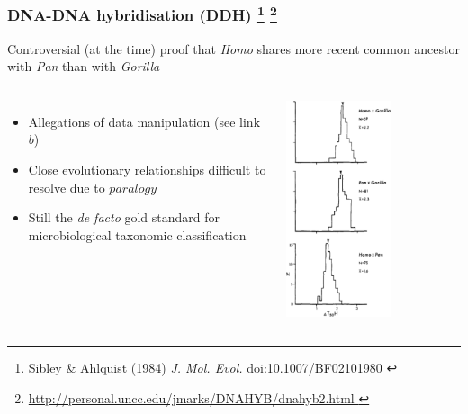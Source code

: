 %
\begin{frame}
  \frametitle{DNA-DNA hybridisation (DDH)
  \footnote{\tiny{\href{http://dx.doi.org/10.1007/BF02101980
}{Sibley \& Ahlquist (1984) \textit{J. Mol. Evol.} doi:10.1007/BF02101980
}}}  
  \footnote{\tiny{\href{http://personal.uncc.edu/jmarks/DNAHYB/dnahyb2.html
}{http://personal.uncc.edu/jmarks/DNAHYB/dnahyb2.html
}}}  
  }
  \textcolor{RawSienna}{Controversial (at the time) proof that \textit{Homo} shares more recent common ancestor with \textit{Pan} than with \textit{Gorilla}} 
  \begin{columns}[T] 
      \begin{itemize}
        \item \textcolor{hutton_green}{Allegations of data manipulation (see link $b$)}
        \item \textcolor{hutton_blue}{Close evolutionary relationships difficult to resolve due to $paralogy$}        
        \item \textcolor{hutton_purple}{Still the \textit{de facto} gold standard for microbiological taxonomic classification}        
      \end{itemize}
      \includegraphics[width=0.6\textwidth]{images/dna-dna_controversy} \\
  \end{columns}    
\end{frame}